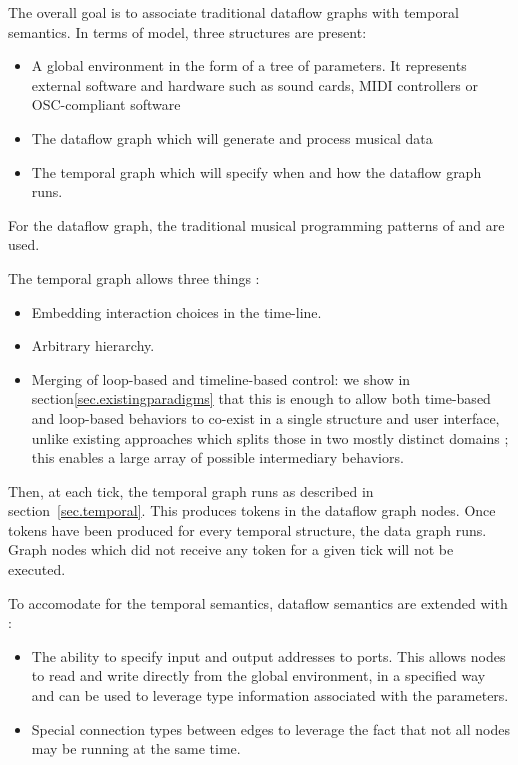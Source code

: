 \documentclass[applsci,article,submit,moreauthors,pdftex,10pt,a4paper]{mdpi}
\begin{document}
The overall goal is to associate traditional dataflow graphs with temporal semantics.
In terms of model, three structures are present: 
\begin{itemize}
    \item A global environment in the form of a tree of parameters. 
          It represents external software and hardware such as sound cards, MIDI controllers or OSC-compliant software
    \item The dataflow graph which will generate and process musical data
    \item The temporal graph which will specify when and how the dataflow graph runs.
\end{itemize}

For the dataflow graph, the traditional musical programming patterns of  and  are used.

The temporal graph allows three things :
\begin{itemize}
\item Embedding interaction choices in the time-line.
\item Arbitrary hierarchy.
\item Merging of loop-based and timeline-based control: we show in section\ref{sec.existingparadigms} that this is enough to allow both time-based and loop-based behaviors to co-exist in a single structure and user interface, unlike existing approaches which splits those in two mostly distinct domains ; this enables a large array of possible intermediary behaviors.
\end{itemize} 

Then, at each tick, the temporal graph runs as described in section~\ref{sec.temporal}.
This produces tokens in the dataflow graph nodes. 
Once tokens have been produced for every temporal structure, the data graph runs.
Graph nodes which did not receive any token for a given tick will not be executed.

To accomodate for the temporal semantics, dataflow semantics are extended with : 
\begin{itemize}
    \item The ability to specify input and output addresses to ports. 
          This allows nodes to read and write directly from the global environment, in a specified way and can be used to leverage type information associated with the parameters.
    \item Special connection types between edges to leverage the fact that not all nodes may be running at the same time.
\end{itemize}
 
\end{document}
